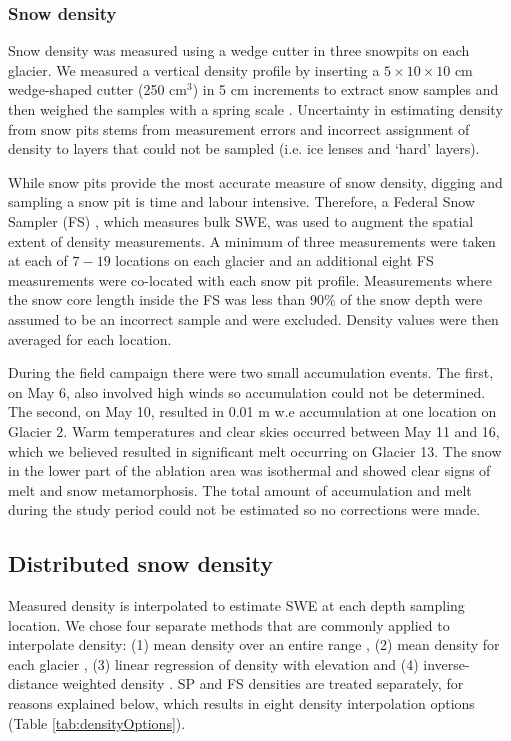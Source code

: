 \documentclass[twocolumn, letterpaper]{igs}
\begin{document}
\subsubsection{Snow density}

Snow density was measured using a wedge cutter in three snowpits on each glacier. We measured a vertical density profile by inserting a $5\times10\times 10$ cm wedge-shaped cutter (250 cm$^3$) in 5 cm increments to extract snow samples and then weighed the samples with a spring scale \citep[e.g.][]{Gray1981,Fierz2009}. Uncertainty in estimating density from snow pits stems from measurement errors and incorrect assignment of density to layers that could not be sampled (i.e. ice lenses and `hard' layers). 

While snow pits provide the most accurate measure of snow density, digging and sampling a snow pit is time and labour intensive. Therefore, a Federal Snow Sampler (FS) \citep{Clyde1932}, which measures bulk SWE, was used to augment the spatial extent of density measurements. A minimum of three measurements were taken at each of $7-19$ locations on each glacier and an additional eight FS measurements were co-located with each snow pit profile. Measurements where the snow core length inside the FS was less than 90\% of the snow depth were assumed to be an incorrect sample and were excluded. Density values were then averaged for each location. 

During the field campaign there were two small accumulation events. The first, on May 6, also involved high winds so accumulation could not be determined. The second, on May 10, resulted in 0.01 m w.e accumulation at one location on Glacier 2. Warm temperatures and clear skies occurred between May 11 and 16, which we believed resulted in significant melt occurring on Glacier 13. The snow in the lower part of the ablation area was isothermal and showed clear signs of melt and snow metamorphosis. The total amount of accumulation and melt during the study period could not be estimated so no corrections were made. 

\subsection{Distributed snow density}

Measured density is interpolated to estimate SWE at each depth sampling location. We chose four separate methods that are commonly applied to interpolate density: (1) mean density over an entire range \citep[e.g.][]{Cullen2017}, (2) mean density for each glacier \citep[e.g.][]{Elder1991, McGrath2015}, (3) linear regression of density with elevation \citep[e.g.][]{Elder1998, Molotch2005} and (4) inverse-distance weighted density \citep[e.g.][]{Molotch2005}.  SP and FS densities are treated separately, for reasons explained below, which results in eight density interpolation options (Table \ref{tab:densityOptions}).
\end{document}
